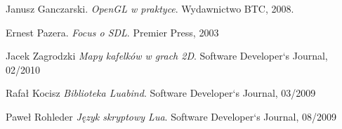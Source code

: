 \begin{thebibliography}{1}

Janusz Ganczarski. 
\emph{OpenGL w praktyce}. Wydawnictwo BTC, 2008.

Ernest Pazera. 
\emph{Focus o SDL}. Premier Press, 2003

Jacek Zagrodzki 
\emph{Mapy kafelków w grach 2D}. Software Developer`s Journal, 02/2010

Rafał Kocisz 
\emph{Biblioteka Luabind}. Software Developer`s Journal, 03/2009

Paweł Rohleder 
\emph{Język skryptowy Lua}. Software Developer`s Journal, 08/2009


\end{thebibliography}



 